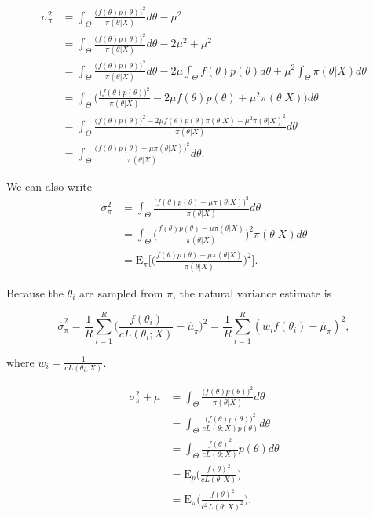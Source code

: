 \documentclass[
  12pt]{article}
\begin{document}
\[
\begin{aligned}
\sigma_{\pi}^2 &= \int_{\Theta} \frac{\big(f(\theta) p(\theta)\big)^2}{\pi(\theta | X)} d\theta - \mu^2 \\
               &= \int_{\Theta} \frac{\big(f(\theta) p(\theta)\big)^2}{\pi(\theta | X)} d\theta - 2\mu^2 + \mu^2 \\
               &= \int_{\Theta} \frac{\big(f(\theta) p(\theta)\big)^2}{\pi(\theta | X)} d\theta - 2\mu \int_{\Theta} f(\theta)p(\theta) d\theta  + \mu^2 \int_{\Theta} \pi(\theta | X) d\theta \\
               &= \int_{\Theta} \Bigg(\frac{\big(f(\theta) p(\theta)\big)^2}{\pi(\theta | X)} - 2\mu f(\theta)p(\theta) + \mu^2 \pi(\theta | X)\Bigg) d\theta \\
               &= \int_{\Theta} \frac{\big(f(\theta) p(\theta)\big)^2 - 2\mu f(\theta)p(\theta)\pi(\theta|X) + \mu^2 \pi(\theta | X)^2}{\pi(\theta | X)}d\theta \\
               &= \int_{\Theta} \frac{\big(f(\theta)p(\theta) - \mu \pi(\theta | X)\big)^2}{\pi(\theta | X)}d\theta.
\end{aligned}
\]

We can also write \[
\begin{aligned}
\sigma_{\pi}^2 &= \int_{\Theta} \frac{\big(f(\theta)p(\theta) - \mu \pi(\theta | X)\big)^2}{\pi(\theta | X)}d\theta \\
               &= \int_{\Theta} \Bigg(\frac{f(\theta)p(\theta) - \mu \pi(\theta | X)}{\pi(\theta | X)}\Bigg)^2 \pi(\theta | X) d\theta \\
               &= \text{E}_{\pi} \Bigg[\bigg(\frac{f(\theta)p(\theta) - \mu \pi(\theta | X)}{\pi(\theta | X)}\bigg)^2 \Bigg].
\end{aligned}
\]

Because the \(\theta_i\) are sampled from \(\pi\), the natural variance
estimate is

\[
\hat{\sigma}^2_{\pi} = \frac{1}{R} \sum_{i=1}^R \Bigg(\frac{f(\theta_i)}{c L(\theta_i;X)} - \hat{\mu}_{\pi} \Bigg)^2 = \frac{1}{R} \sum_{i=1}^R (w_if(\theta_i) - \hat{\mu}_{\pi})^2,
\]

where \(w_i = \frac{1}{cL(\theta_i; X)}\).

\[
\begin{aligned}
\sigma^2_{\pi} + \mu &= \int_{\Theta} \frac{\big(f(\theta)p(\theta)\big)^2}{\pi(\theta | X)} d\theta \\
                     &= \int_{\Theta} \frac{\big(f(\theta)p(\theta)\big)^2}{cL(\theta; X)p(\theta)} d\theta \\ 
                     &= \int_{\Theta} \frac{f(\theta)^2}{cL(\theta; X)} p(\theta) d\theta \\
                     &= \text{E}_p\Bigg(\frac{f(\theta)^2}{cL(\theta; X)} \Bigg) \\
                     &= \text{E}_{\pi}\Bigg(\frac{f(\theta)^2}{c^2L(\theta; X)^2} \Bigg).
\end{aligned}
\]
\end{document}
